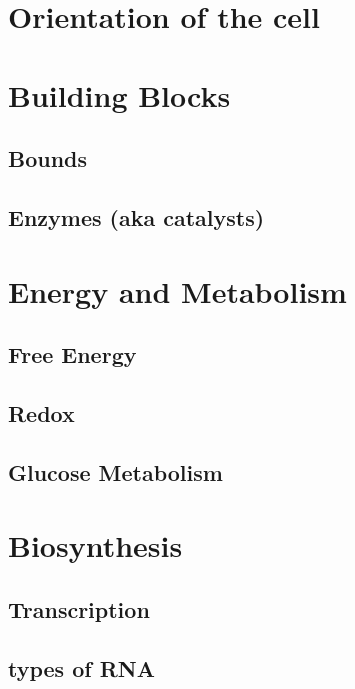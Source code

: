 \documentclass[12pt]{cheatsheet}
\author{Gian Maria Ernst - ernstg\\  \vspace*{0.2em} \vspace*{-0.2em}}\doctitle{Bioengineering}
\begin{document}
\small


\section*{Orientation of the cell}


\section*{Building Blocks}

\subsection*{Bounds}


\subsection*{Enzymes (aka catalysts)}


\section*{Energy and Metabolism}

\subsection*{Free Energy}

\subsection*{Redox}

\subsection*{Glucose Metabolism}


\section*{Biosynthesis}

\subsection*{Transcription}

\subsection*{types of RNA}

\end{document}
